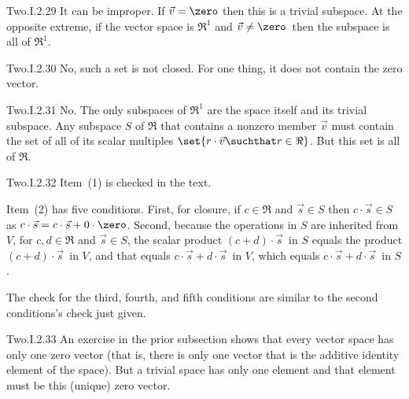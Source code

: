 \begin{ans}{Two.I.2.29}
      It can be improper.
      If \( \vec{v}=\zero \) then this is a trivial subspace.
      At the opposite extreme,
      if the vector space is \( \Re^1 \) and \( \vec{v}\neq\zero\, \)
      then the subspace is all of $\Re^1$.
    
\end{ans}
\begin{ans}{Two.I.2.30}
      No, such a set is not closed.
      For one thing, it does not contain the zero vector.
    
\end{ans}
\begin{ans}{Two.I.2.31}
      No.
      The only subspaces of \( \Re^1 \) are the space itself and its
      trivial subspace.
      Any subspace $S$ of $\Re$ that contains a nonzero member $\vec{v}$
      must contain the set of all of its scalar multiples
      $\set{r\cdot\vec{v}\suchthat r\in\Re}$.
      But this set is all of $\Re$.
    
\end{ans}
\begin{ans}{Two.I.2.32}
      Item~(1) is checked in the text.

      Item~(2) has five conditions.
      First, for closure, if \( c\in\Re \) and \( \vec{s}\in S \) then
      \( c\cdot\vec{s}\in S \) as
      \( c\cdot\vec{s}=c\cdot\vec{s}+0\cdot\zero \).
      Second, because the operations in \( S \) are inherited from \( V \),
      for \( c,d\in\Re \) and \( \vec{s}\in S \), the scalar product
      \( (c+d)\cdot\vec{s}\, \) in \( S \) equals the product
      \( (c+d)\cdot\vec{s}\, \) in \( V \), and that equals
      \( c\cdot\vec{s}+d\cdot\vec{s}\, \) in \( V \), which equals
      \( c\cdot\vec{s}+d\cdot\vec{s}\, \) in \( S \).

      The check for the third, fourth, and fifth conditions are similar to the
      second conditions's check just given.
    
\end{ans}
\begin{ans}{Two.I.2.33}
      An exercise in the prior subsection shows that every vector space
      has only one zero vector (that is, there is only one vector that is the
      additive identity element of the space).
      But a trivial space has only one element and that element must be this
      (unique) zero vector.
    
\end{ans}
